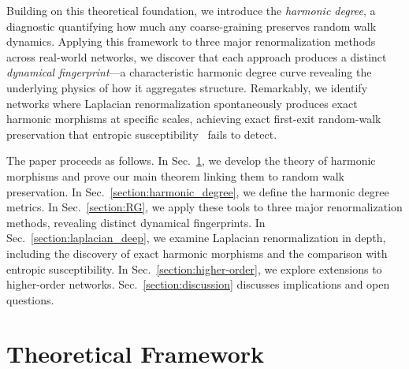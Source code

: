 \documentclass[twocolumn,superscriptaddress,tightenlines,aps,prx,floatfix]{revtex4-2}
\begin{document}
\begin{bibunit}
Building on this theoretical foundation, we introduce the \emph{harmonic degree}, a diagnostic quantifying how much any coarse-graining preserves random walk dynamics. 
Applying this framework to three major renormalization methods across real-world networks, we discover that each approach produces a distinct \emph{dynamical fingerprint}---a characteristic harmonic degree curve revealing the underlying physics of how it aggregates structure. Remarkably, we identify networks where Laplacian renormalization spontaneously produces exact harmonic morphisms at specific scales, achieving exact first-exit random-walk preservation that entropic susceptibility~\cite{Villegas_Laplacian_renorm_heterogeneous_2023,nurisso2025higher} fails to detect.

The paper proceeds as follows. 
In Sec.~\ref{section:harmonic_morphisms}, we develop the theory of harmonic morphisms and prove our main theorem linking them to random walk preservation. 
In Sec.~\ref{section:harmonic_degree}, we define the harmonic degree metrics. 
In Sec.~\ref{section:RG}, we apply these tools to three major renormalization methods, revealing distinct dynamical fingerprints. 
In Sec.~\ref{section:laplacian_deep}, we examine Laplacian renormalization in depth, including the discovery of exact harmonic morphisms and the comparison with entropic susceptibility. 
In Sec.~\ref{section:higher-order}, we explore extensions to higher-order networks.
Sec.~\ref{section:discussion} discusses implications and open questions.


\section{Theoretical Framework}
\label{section:harmonic_morphisms}


\end{bibunit}
\end{document}

